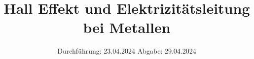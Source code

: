 

\subject{V511}
\title{Hall Effekt und Elektrizitätsleitung bei Metallen}
\date{%
  Durchführung: 23.04.2024
  \hspace{3em}
  Abgabe: 29.04.2024
}



\maketitle
\thispagestyle{empty}
\tableofcontents
\newpage






\printbibliography{}



